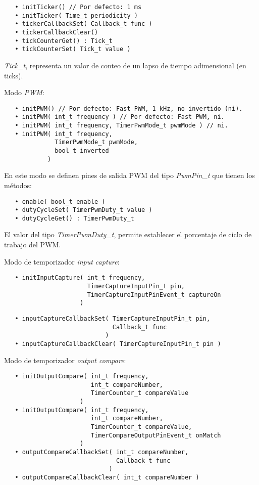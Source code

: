 \begin{verbatim}
   • initTicker() // Por defecto: 1 ms
   • initTicker( Time_t periodicity )
   • tickerCallbackSet( Callback_t func )
   • tickerCallbackClear()
   • tickCounterGet() : Tick_t
   • tickCounterSet( Tick_t value )
\end{verbatim}

\emph{Tick\_t}, representa un valor de conteo de un lapso de tiempo adimensional (en ticks).

Modo \emph{PWM}:

\begin{verbatim}
   • initPWM() // Por defecto: Fast PWM, 1 kHz, no invertido (ni).
   • initPWM( int_t frequency ) // Por defecto: Fast PWM, ni.
   • initPWM( int_t frequency, TimerPwmMode_t pwmMode ) // ni.
   • initPWM( int_t frequency, 
              TimerPwmMode_t pwmMode, 
              bool_t inverted 
            )
\end{verbatim}

En este modo se definen pines de salida PWM del tipo \emph{PwmPin\_t} que tienen los métodos:

\begin{verbatim}
   • enable( bool_t enable )
   • dutyCycleSet( TimerPwmDuty_t value )
   • dutyCycleGet() : TimerPwmDuty_t
\end{verbatim}

El valor del tipo \emph{TimerPwmDuty\_t}, permite establecer el porcentaje de ciclo de trabajo del PWM.

Modo de temporizador \emph{input capture}:

\begin{verbatim}
   • initInputCapture( int_t frequency, 
                       TimerCaptureInputPin_t pin,
                       TimerCaptureInputPinEvent_t captureOn
                     )
\end{verbatim}

\pagebreak
\begin{verbatim}
   • inputCaptureCallbackSet( TimerCaptureInputPin_t pin,
                              Callback_t func 
                            )
   • inputCaptureCallbackClear( TimerCaptureInputPin_t pin )
\end{verbatim}

Modo de temporizador \emph{output compare}:

\begin{verbatim}
   • initOutputCompare( int_t frequency,
                        int_t compareNumber,
                        TimerCounter_t compareValue
                     )
   • initOutputCompare( int_t frequency,
                        int_t compareNumber,
                        TimerCounter_t compareValue,
                        TimerCompareOutputPinEvent_t onMatch
                     )
   • outputCompareCallbackSet( int_t compareNumber,
   							   Callback_t func
                             )
   • outputCompareCallbackClear( int_t compareNumber )
\end{verbatim}


